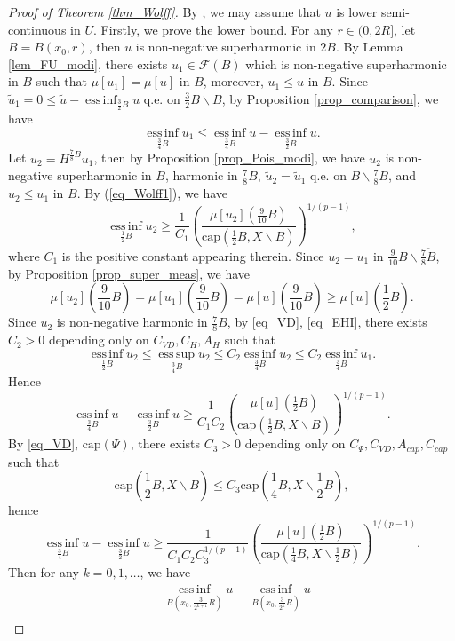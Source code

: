 \documentclass[10pt,a4paper]{amsart}
\newcommand{\einf}{\operatorname*{ess\,inf}}
\newcommand{\esup}{\operatorname*{ess\,sup}}
\begin{document}
\begin{proof}[Proof of Theorem \ref{thm_Wolff}]
By \hyperlink{eq_LSC}{}, we may assume that $u$ is lower semi-continuous in $U$. Firstly, we prove the lower bound. For any $r\in(0,2R]$, let $B=B(x_0,r)$, then $u$ is non-negative superharmonic in $2B$. By Lemma \ref{lem_FU_modi}, there exists $u_1\in \mathcal{F}(B)$ which is non-negative superharmonic in $B$ such that $\mu[u_1]=\mu[u]$ in $B$, moreover, $u_1\le u$ in $B$. Since $\widetilde{u}_1=0\le \widetilde{u}-\einf_{\frac{3}{2}B}u$ q.e. on $\frac{3}{2}B\backslash B$, by Proposition \ref{prop_comparison}, we have
$$\einf_{\frac{3}{4}B}u_1\le \einf_{\frac{3}{4}B}u-\einf_{\frac{3}{2}B}u.$$
Let $u_2=H^{\frac{7}{8}B}u_1$, then by Proposition \ref{prop_Pois_modi}, we have $u_2$ is non-negative superharmonic in $B$, harmonic in $\frac{7}{8}B$, $\widetilde{u}_2=\widetilde{u}_1$ q.e. on $B\backslash \frac{7}{8}B$, and $u_2\le u_1$ in $B$. By (\ref{eq_Wolff1}), we have
$$\einf_{\frac{1}{2}B}u_2\ge \frac{1}{C_1}\left(\frac{\mu[u_2]\left(\frac{9}{10}B\right)}{\mathrm{cap}\left(\frac{1}{2}B,X\backslash B\right)}\right)^{1/(p-1)},$$
where $C_1$ is the positive constant appearing therein. Since $u_2=u_1$ in $\frac{9}{10}B\backslash \overline{\frac{7}{8}B}$, by Proposition \ref{prop_super_meas}, we have
$$\mu[u_2]\left(\frac{9}{10}B\right)=\mu[u_1]\left(\frac{9}{10}B\right)=\mu[u]\left(\frac{9}{10}B\right)\ge \mu[u]\left(\frac{1}{2}B\right).$$
Since $u_2$ is non-negative harmonic in $\frac{7}{8}B$, by \ref{eq_VD}, \ref{eq_EHI}, there exists $C_2>0$ depending only on $C_{VD}, C_H, A_H$ such that
$$\einf_{\frac{1}{2}B}u_2\le \esup_{\frac{3}{4}B}u_2\le C_2\einf_{\frac{3}{4}B}u_2\le C_2\einf_{\frac{3}{4}B}u_1.$$
Hence
$$\einf_{\frac{3}{4}B}u-\einf_{\frac{3}{2}B}u\ge \frac{1}{C_1C_2}\left(\frac{\mu[u]\left(\frac{1}{2}B\right)}{\mathrm{cap}\left(\frac{1}{2}B,X\backslash B\right)}\right)^{1/(p-1)}.$$
By \ref{eq_VD}, \hyperlink{eq_cap}{$\text{cap}(\Psi)$}, there exists $C_3>0$ depending only on $C_{\Psi}, C_{VD}, A_{cap}, C_{cap}$ such that
$${\mathrm{cap}\left(\frac{1}{2}B,X\backslash B\right)}\le C_3{\mathrm{cap}\left(\frac{1}{4}B,X\backslash \frac{1}{2}B\right)},$$
hence
$$\einf_{\frac{3}{4}B}u-\einf_{\frac{3}{2}B}u\ge\frac{1}{C_1C_2C_3^{1/(p-1)}}\left(\frac{\mu[u]\left(\frac{1}{2}B\right)}{\mathrm{cap}\left(\frac{1}{4}B,X\backslash \frac{1}{2}B\right)}\right)^{1/(p-1)}.$$
Then for any $k=0,1,\ldots$, we have
\begin{align*}
&\einf_{B(x_0,\frac{3}{2^{k+1}}R)}u-\einf_{B(x_0,\frac{3}{2^{k}}R)}u\\

\end{align*}
\end{proof}
\end{document}
